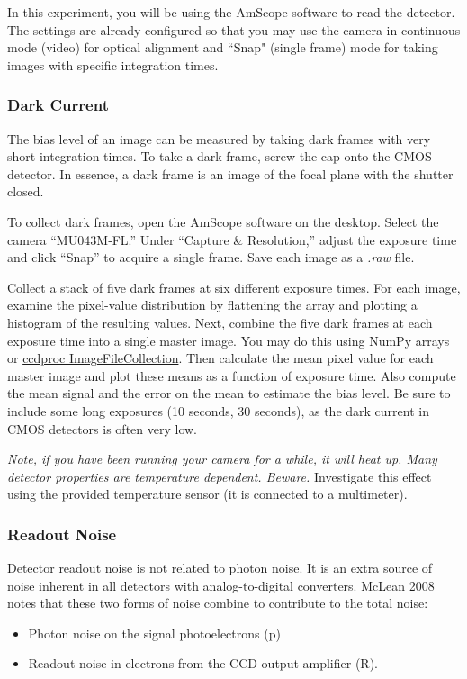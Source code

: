\documentclass{../lab}
\begin{document}
In this experiment, you will be using the AmScope software to read the detector. The settings are already configured so that you may use the camera in continuous mode (video) for optical alignment and ``Snap" (single frame) mode for taking images with specific integration times.

\subsubsection{Dark Current}

The bias level of an image can be measured by taking dark frames with very short integration times. To take a dark frame, screw the cap onto the CMOS detector. In essence, a dark frame is an image of the focal plane with the shutter closed.

To collect dark frames, open the AmScope software on the desktop. Select the camera “MU043M‑FL.” Under “Capture \& Resolution,” adjust the exposure time and click “Snap” to acquire a single frame. Save each image as a \textit{.raw} file.

Collect a stack of five dark frames at six different exposure times. For each image, examine the pixel-value distribution by flattening the array and plotting a histogram of the resulting values. Next, combine the five dark frames at each exposure time into a single master image. You may do this using NumPy arrays or \href{https://ccdproc.readthedocs.io/en/latest/api/ccdproc.ImageFileCollection.html}{ccdproc ImageFileCollection}.
Then calculate the mean pixel value for each master image and plot these means as a function of exposure time. Also compute the mean signal and the error on the mean to estimate the bias level. Be sure to include some long exposures (10 seconds, 30 seconds), as the dark current in CMOS detectors is often very low.

\emph{Note, if you have been running your camera for a while, it will heat up. Many detector properties are temperature dependent. Beware.} Investigate this effect using the provided temperature sensor (it is connected to a multimeter).

\subsubsection{Readout Noise}

Detector readout noise is not related to photon noise. It is an extra source of noise inherent in all detectors with analog-to-digital converters. McLean 2008 notes that these two forms of noise
combine to contribute to the total noise:
\begin{itemize}
    \item Photon noise on the signal photoelectrons (p)
    \item Readout noise in electrons from the CCD output amplifier (R).
\end{itemize}
\end{document}
